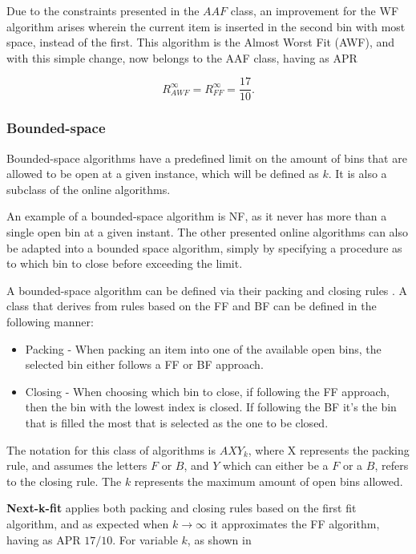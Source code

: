 Due to the constraints presented in the $AAF$ class, an improvement for the WF algorithm arises wherein the current item is inserted in the second bin with most space, instead of the first. This algorithm is the Almost Worst Fit (AWF), and with this simple change, now belongs to the AAF class, having as APR

\begin{equation}
    R_{AWF}^\infty = R_{FF}^\infty = \frac{17}{10}.
\end{equation}

\subsubsection{Bounded-space} 

Bounded-space algorithms have a predefined limit on the amount of bins that are allowed to be open at a given instance, which will be defined as $k$. It is also a subclass of the online algorithms.

An example of a bounded-space algorithm is NF, as it never has more than a single open bin at a given instant. The other presented online algorithms can also be adapted into a bounded space algorithm, simply by specifying a procedure as to which bin to close before exceeding the limit.

A bounded-space algorithm can be defined via their packing and closing rules \cite{coffman2013bin}. A class that derives from rules based on the FF and BF can be defined in the following manner: 
\begin{itemize}
    \item Packing - When packing an item into one of the available open bins, the selected bin either follows a FF or BF approach.
    \item Closing - When choosing which bin to close, if following the FF approach, then the bin with the lowest index is closed. If following the BF it's the bin that is filled the most that is selected as the one to be closed.
\end{itemize}

The notation for this class of algorithms is $AXY_k$, where X represents the packing rule, and assumes the letters $F$ or $B$, and $Y$ which can either be a $F$ or a $B$, refers to the closing rule. The $k$ represents the maximum amount of open bins allowed.

\textbf{Next-k-fit} applies both packing and closing rules based on the first fit algorithm, and as expected when $k \to \infty$ it approximates the FF algorithm, having as APR $17/10$. For variable $k$, as shown in \cite{mao1993tight}

